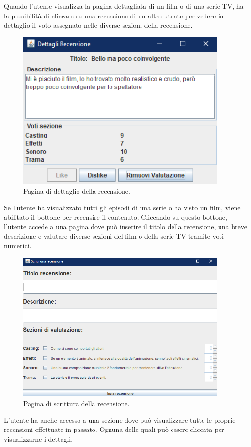 \documentclass[a4paper,12pt]{report}
\begin{document}
Quando l'utente visualizza la pagina dettagliata di un film o di una serie TV, ha la possibilità di cliccare su una recensione di un altro utente per vedere in dettaglio il voto assegnato nelle diverse sezioni della recensione. 
\begin{figure}[H]
	\centering
	\includegraphics[width=300pt]{appimg/userrecdetails.png}
	\caption{Pagina di dettaglio della recensione.}
\end{figure}

Se l'utente ha visualizzato tutti gli episodi di una serie o ha visto un film, viene abilitato il bottone per recensire il contenuto. Cliccando su questo bottone, l'utente accede a una pagina dove può inserire il titolo della recensione, una breve descrizione e valutare diverse sezioni del film o della serie TV tramite voti numerici.
\begin{figure}[H]
	\centering
	\includegraphics[width=300pt]{appimg/userwriterec.png}
	\caption{Pagina di scrittura della recensione.}
\end{figure}

L'utente ha anche accesso a una sezione dove può visualizzare tutte le proprie recensioni effettuate in passato. Ognuna delle quali può essere cliccata per visualizzarne i dettagli. 
\end{document}
